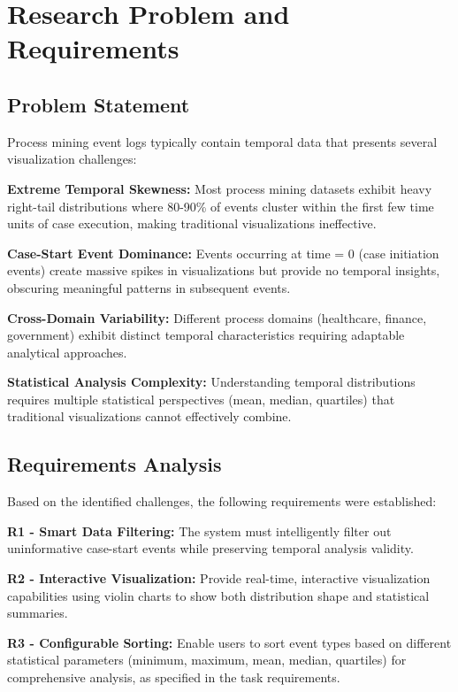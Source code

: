 \documentclass[11pt,a4paper]{article}
\begin{document}
\section{Research Problem and Requirements}
\label{sec:problem}

\subsection{Problem Statement}

Process mining event logs typically contain temporal data that presents several visualization challenges:

\textbf{Extreme Temporal Skewness:} Most process mining datasets exhibit heavy right-tail distributions where 80-90\% of events cluster within the first few time units of case execution, making traditional visualizations ineffective.

\textbf{Case-Start Event Dominance:} Events occurring at time = 0 (case initiation events) create massive spikes in visualizations but provide no temporal insights, obscuring meaningful patterns in subsequent events.

\textbf{Cross-Domain Variability:} Different process domains (healthcare, finance, government) exhibit distinct temporal characteristics requiring adaptable analytical approaches.

\textbf{Statistical Analysis Complexity:} Understanding temporal distributions requires multiple statistical perspectives (mean, median, quartiles) that traditional visualizations cannot effectively combine.

\subsection{Requirements Analysis}

Based on the identified challenges, the following requirements were established:

\textbf{R1 - Smart Data Filtering:} The system must intelligently filter out uninformative case-start events while preserving temporal analysis validity.

\textbf{R2 - Interactive Visualization:} Provide real-time, interactive visualization capabilities using violin charts to show both distribution shape and statistical summaries.

\textbf{R3 - Configurable Sorting:} Enable users to sort event types based on different statistical parameters (minimum, maximum, mean, median, quartiles) for comprehensive analysis, as specified in the task requirements.
\end{document}
